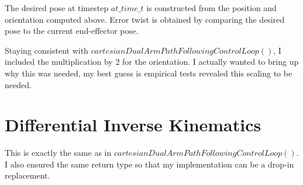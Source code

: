 \documentclass[11pt]{article}
\begin{document}
The desired pose at timestep $at\_time\_t$ is constructed from the position and orientation computed above. Error twist is obtained by comparing the desired pose to the current end-effector pose.

Staying consistent with $cartesianDualArmPathFollowingControlLoop()$, I included the multiplication by 2 for the orientation. I actually wanted to bring up why this was needed, my best guess is empirical tests revealed this scaling to be needed.

\section*{Differential Inverse Kinematics}

This is exactly the same as in $cartesianDualArmPathFollowingControlLoop()$. I also ensured the same return type so that my implementation can be a drop-in replacement.
\end{document}
